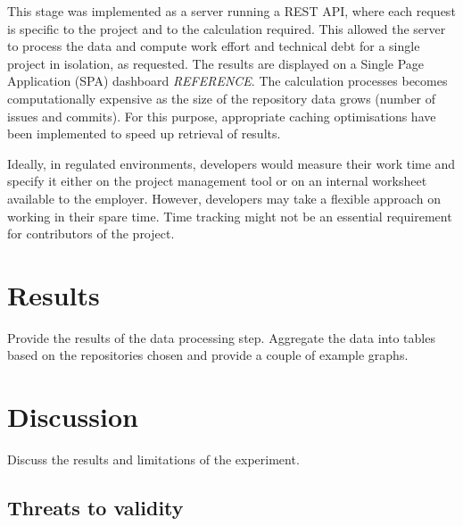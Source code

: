 \documentclass{mpaper}
\begin{document}
This stage was implemented as a server running a REST API, where each request is
specific to the project and to the calculation required. This allowed the server
to process the data and compute work effort and technical debt for a single
project in isolation, as requested. The results are displayed on a Single Page
Application (SPA) dashboard \emph{REFERENCE}. The calculation processes becomes
computationally expensive as the size of the repository data grows (number of
issues and commits). For this purpose, appropriate caching optimisations have
been implemented to speed up retrieval of results.

Ideally, in regulated environments, developers would measure their work time and
specify it either on the project management tool or on an internal worksheet
available to the employer. However, developers may take a flexible approach on
working in their spare time. Time tracking might not be an essential requirement
for contributors of the project. 

\section{Results}
\label{results}

Provide the results of the data processing step. Aggregate the data into tables
based on the repositories chosen and provide a couple of example graphs. 

\section{Discussion}
\label{discussion}

Discuss the results and limitations of the experiment.

\subsection{Threats to validity}
\label{validity}
\end{document}
